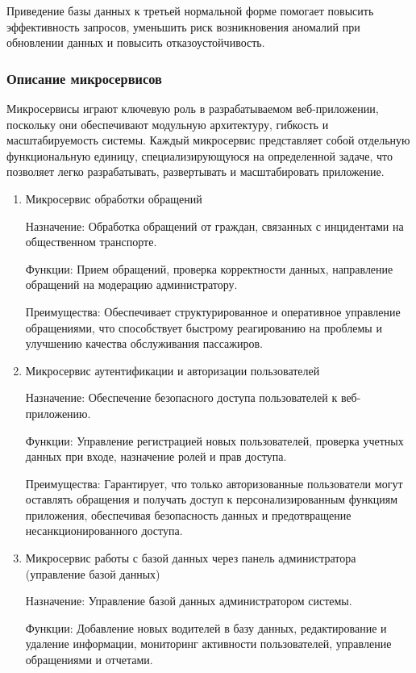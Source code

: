 Приведение базы данных к третьей нормальной форме помогает повысить эффективность запросов, уменьшить риск возникновения аномалий при обновлении данных и повысить отказоустойчивость.

\subsubsection{Описание микросервисов}
Микросервисы играют ключевую роль в разрабатываемом веб-приложении, поскольку они обеспечивают модульную архитектуру, гибкость и масштабируемость системы. Каждый микросервис представляет собой отдельную функциональную единицу, специализирующуюся на определенной задаче, что позволяет легко разрабатывать, развертывать и масштабировать приложение.
\begin{enumerate}
	\item Микросервис обработки обращений
	
	Назначение: Обработка обращений от граждан, связанных с инцидентами на общественном транспорте.
	
	Функции: Прием обращений, проверка корректности данных, направление обращений на модерацию администратору.
	
	Преимущества: Обеспечивает структурированное и оперативное управление обращениями, что способствует быстрому реагированию на проблемы и улучшению качества обслуживания пассажиров.
	
	\item Микросервис аутентификации и авторизации пользователей
	
	Назначение: Обеспечение безопасного доступа пользователей к веб-приложению.
	
	Функции: Управление регистрацией новых пользователей, проверка учетных данных при входе, назначение ролей и прав доступа.
	
	Преимущества: Гарантирует, что только авторизованные пользователи могут оставлять обращения и получать доступ к персонализированным функциям приложения, обеспечивая безопасность данных и предотвращение несанкционированного доступа.
	
	\item Микросервис работы с базой данных через панель администратора (управление базой данных)
	
	Назначение: Управление базой данных администратором системы.
	
	Функции: Добавление новых водителей в базу данных, редактирование и удаление информации, мониторинг активности пользователей, управление обращениями и отчетами.
	

\end{enumerate}
